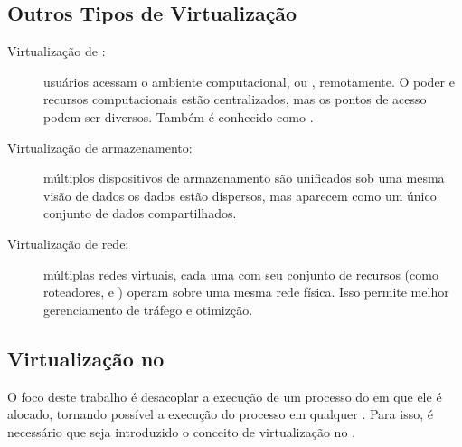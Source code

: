 \subsection{Outros Tipos de Virtualização}
\begin{description}
    \item [Virtualização de \desktop:] usuários acessam o ambiente computacional, ou \desktop, remotamente. O poder e recursos computacionais estão centralizados, mas os pontos de acesso podem ser diversos. Também é conhecido como \vdi.
    \item [Virtualização de armazenamento:] múltiplos dispositivos de armazenamento são unificados sob uma mesma visão de dados \ie os dados estão dispersos, mas aparecem como um único conjunto de dados compartilhados.
    \item [Virtualização de rede:] múltiplas redes virtuais, cada uma com seu conjunto de recursos (como roteadores, \switches e \firewalls) operam sobre uma mesma rede física. Isso permite melhor gerenciamento de tráfego e otimizção.
\end{description}

\subsection{Virtualização no \nanvix}

O foco deste trabalho é desacoplar a execução de um processo do \cluster em que ele é alocado, tornando possível a execução do processo em qualquer \cluster. Para isso, é necessário que seja introduzido o conceito de virtualização no \nanvix.

